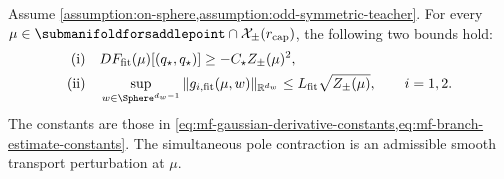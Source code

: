 \begin{lemma}
\label{lem:mf-pole-contraction-estimates}
Assume \cref{assumption:on-sphere,assumption:odd-symmetric-teacher}.
For every \(\mu\in\submanifoldforsaddlepoint\cap
\mathcal X_\pm(r_{\mathrm{cap}})\), the following two bounds hold:
\begin{equation}
\label{eq:mf-pole-contraction-estimates}
\begin{aligned}
 \textup{(i)}\quad &DF_{\mathrm{fit}}(\mu)[(q_\star,q_\star)]
                  \ge-C_\star Z_\pm(\mu)^2,\\
 \textup{(ii)}\quad &\sup_{w\in\Sphere^{d_w-1}}
       \|g_{i,\mathrm{fit}}(\mu,w)\|_{\mathbb R^{d_w}}
       \le L_{\mathrm{fit}}\sqrt{Z_\pm(\mu)},\qquad i=1,2.
\end{aligned}
\end{equation}
The constants are those in
\cref{eq:mf-gaussian-derivative-constants,eq:mf-branch-estimate-constants}.
The simultaneous pole contraction is an admissible smooth transport
perturbation at \(\mu\).
\end{lemma}

